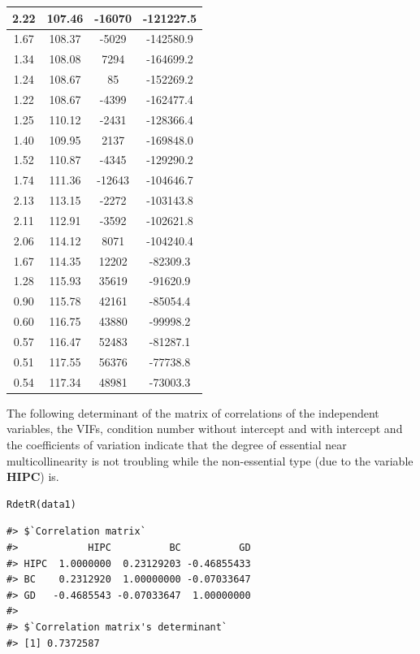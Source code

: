 \begin{table}
\begin{tabular}[t]{c|c|c|c}
2.22 & 107.46 & -16070 & -121227.5\\
\hline
1.67 & 108.37 & -5029 & -142580.9\\
\hline
1.34 & 108.08 & 7294 & -164699.2\\
\hline
1.24 & 108.67 & 85 & -152269.2\\
\hline
1.22 & 108.67 & -4399 & -162477.4\\
\hline
1.25 & 110.12 & -2431 & -128366.4\\
\hline
1.40 & 109.95 & 2137 & -169848.0\\
\hline
1.52 & 110.87 & -4345 & -129290.2\\
\hline
1.74 & 111.36 & -12643 & -104646.7\\
\hline
2.13 & 113.15 & -2272 & -103143.8\\
\hline
2.11 & 112.91 & -3592 & -102621.8\\
\hline
2.06 & 114.12 & 8071 & -104240.4\\
\hline
1.67 & 114.35 & 12202 & -82309.3\\
\hline
1.28 & 115.93 & 35619 & -91620.9\\
\hline
0.90 & 115.78 & 42161 & -85054.4\\
\hline
0.60 & 116.75 & 43880 & -99998.2\\
\hline
0.57 & 116.47 & 52483 & -81287.1\\
\hline
0.51 & 117.55 & 56376 & -77738.8\\
\hline
0.54 & 117.34 & 48981 & -73003.3\\
\hline
\end{tabular}
\end{table}

The following determinant of the matrix of correlations of the independent variables, the VIFs, condition number without intercept and with intercept and the coefficients of variation indicate that the degree of essential near multicollinearity is not troubling while the non-essential type (due to the variable \textbf{HIPC}) is.

\begin{verbatim}
RdetR(data1)
\end{verbatim}

\begin{verbatim}
#> $`Correlation matrix`
#>            HIPC          BC          GD
#> HIPC  1.0000000  0.23129203 -0.46855433
#> BC    0.2312920  1.00000000 -0.07033647
#> GD   -0.4685543 -0.07033647  1.00000000
#> 
#> $`Correlation matrix's determinant`
#> [1] 0.7372587
\end{verbatim}

